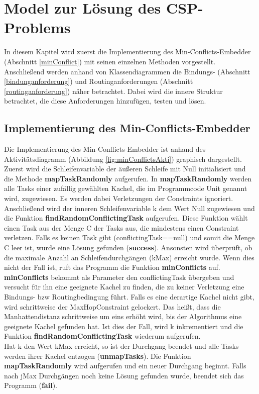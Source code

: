 \chapter{Model zur Lösung des CSP-Problems}\label{model}

In diesem Kapitel wird zuerst die Implementierung des Min-Conflicts-Embedder (Abschnitt \ref{minConflict}) mit seinen einzelnen Methoden vorgestellt. Anschließend werden anhand von Klassendiagrammen die Bindungs- (Abschnitt \ref{bindunganforderung}) und Routinganforderungen (Abschnitt \ref{routinganforderung}) näher betrachtet. Dabei wird die innere Struktur betrachtet, die diese Anforderungen hinzufügen, testen und lösen.
\section{Implementierung des Min-Conflicts-Embedder}\label{minConflictImpl}

Die Implementierung des Min-Conflicts-Embedder ist anhand des Aktivitätsdiagramm (Abbildung \ref{fig:minConflictsAkti}) graphisch dargestellt. Zuerst wird die Schleifenvariable der äußeren Schleife mit Null initialisiert und die Methode \textbf{mapTaskRandomly} aufgerufen. In \textbf{mapTaskRandomly} werden alle Tasks einer zufällig gewählten Kachel, die im Programmcode Unit genannt wird, zugewiesen. Es werden dabei Verletzungen der Constraints ignoriert. Anschließend wird der inneren Schleifenvariable k dem Wert Null zugewiesen und die Funktion \textbf{findRandomConflictingTask} aufgerufen. Diese Funktion wählt einen Task aus der Menge C der Tasks aus, die mindestens einen Constraint verletzen. Falls es keinen Task gibt (conflictingTask==null) und somit die Menge C leer ist, wurde eine Lösung gefunden (\textbf{success}). Ansonsten wird überprüft, ob die maximale Anzahl an Schleifendurchgängen (kMax) erreicht wurde. Wenn dies nicht der Fall ist, ruft das Programm die Funktion \textbf{minConflicts} auf. \textbf{minConflicts} bekommt als Parameter den conflictingTask übergeben und versucht für ihn eine geeignete Kachel zu finden, die zu keiner Verletzung eine Bindungs- bzw Routingbedingung führt. Falls es eine derartige Kachel nicht gibt, wird schrittweise der MaxHopConstraint gelockert. Das heißt, dass die Manhattendistanz schrittweise um eins erhöht wird, bis der Algorithmus eine geeignete Kachel gefunden hat. Ist dies der Fall, wird k inkrementiert und die Funktion \textbf{findRandomConflictingTask} wiederum aufgerufen. \\
Hat k den Wert kMax erreicht, so ist der Durchgang beendet und alle Tasks werden ihrer Kachel entzogen (\textbf{unmapTasks}). Die Funktion \textbf{mapTaskRandomly} wird aufgerufen und ein neuer Durchgang beginnt. Falls nach jMax Durchgängen noch keine Lösung gefunden wurde, beendet sich das Programm (\textbf{fail}).

